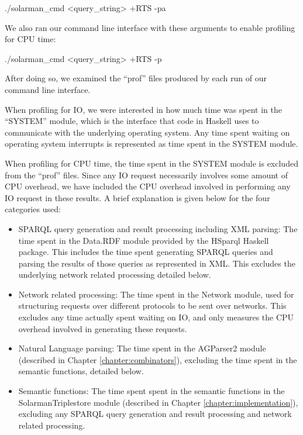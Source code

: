 \documentclass[../main.tex]{subfiles}
\begin{document}
\begin{code}
	./solarman_cmd <query_string> +RTS -pa
\end{code}

We also ran our command line interface with these arguments to enable profiling for CPU time:

\begin{code}
./solarman_cmd <query_string> +RTS -p
\end{code}

After doing so, we examined the ``prof'' files produced by each run of our command line interface.

When profiling for IO, we were interested in how much time was spent in the ``SYSTEM'' module, which is the interface
that code in Haskell uses to communicate with the underlying operating system.  Any time spent waiting on operating system
interrupts is represented as time spent in the SYSTEM module.

When profiling for CPU time, the time spent in the SYSTEM module is excluded from the ``prof'' files.
Since any IO request necessarily involves some amount of CPU overhead, we have included the CPU overhead
involved in performing any IO request in these results.  A brief explanation is given below for the four categories used:

\begin{itemize}
	\item SPARQL query generation and result processing including XML parsing:  The time spent in the Data.RDF module provided by the HSparql Haskell package.  This includes the time spent generating SPARQL queries and parsing the results of those queries as represented in XML.  This excludes the underlying network related processing detailed below.
	\item Network related processing: The time spent in the Network module, used for structuring requests over different protocols to be sent over networks.  This excludes any time actually spent waiting on IO, and only measures the CPU overhead involved in generating these requests.
	\item Natural Language parsing: The time spent in the AGParser2 module (described in Chapter \ref{chapter:combinators}), excluding the time spent in the semantic functions, detailed below.
	\item Semantic functions: The time spent spent in the semantic functions in the SolarmanTriplestore module (described in Chapter \ref{chapter:implementation}), excluding any SPARQL query generation and result processing and network related processing.
\end{itemize}
\end{document}
